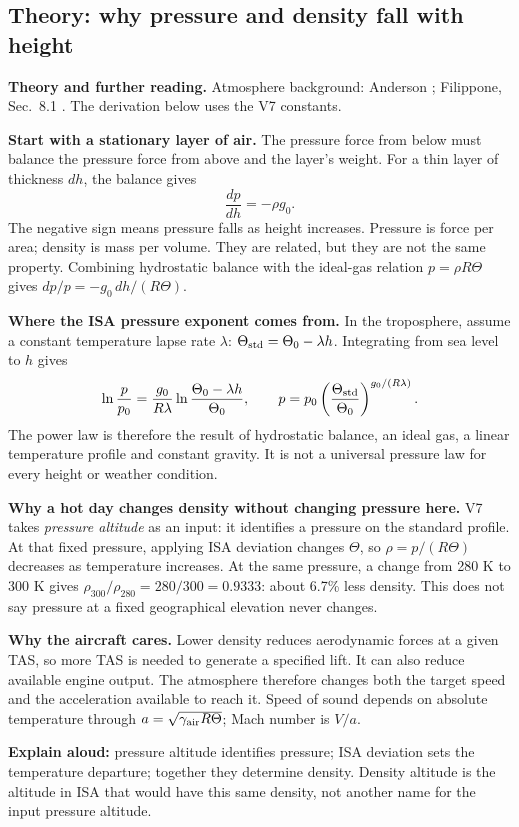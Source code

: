 \documentclass[11pt,letterpaper]{article}
\newcommand{\theorypage}[1]{\clearpage\subsection*{\color{navy}\thesection\enspace Theory: #1}}
\newcommand{\reading}[1]{{\small\color{navy}\textbf{Theory and further reading.} #1\par}\vspace{3pt}}
\begin{document}
\theorypage{why pressure and density fall with height}
\reading{Atmosphere background: Anderson \cite{anderson-flight}; Filippone, Sec.~8.1 \cite{filippone}. The derivation below uses the V7 constants.}
\textbf{Start with a stationary layer of air.}
The pressure force from below must balance the pressure force from above and
the layer's weight. For a thin layer of thickness $dh$, the balance gives
\[
\frac{dp}{dh}=-\rho g_0.
\]
The negative sign means pressure falls as height increases. Pressure is force
per area; density is mass per volume. They are related, but they are not the
same property. Combining hydrostatic balance with the ideal-gas relation
$p=\rho R\Theta$ gives $dp/p=-g_0\,dh/(R\Theta)$.

\textbf{Where the ISA pressure exponent comes from.}
In the troposphere, assume a constant temperature lapse rate $\lambda$:
$\Theta_{\rm std}=\Theta_0-\lambda h$. Integrating from sea level to $h$ gives
\[
\ln\frac{p}{p_0}=\frac{g_0}{R\lambda}
\ln\frac{\Theta_0-\lambda h}{\Theta_0},
\qquad
p=p_0\left(\frac{\Theta_{\rm std}}{\Theta_0}\right)^{g_0/(R\lambda)}.
\]
The power law is therefore the result of hydrostatic balance, an ideal gas,
a linear temperature profile and constant gravity. It is not a universal
pressure law for every height or weather condition.

\textbf{Why a hot day changes density without changing pressure here.}
V7 takes \emph{pressure altitude} as an input: it identifies a pressure on the
standard profile. At that fixed pressure, applying ISA deviation changes
$\Theta$, so $\rho=p/(R\Theta)$ decreases as temperature increases. At the same
pressure, a change from 280 K to 300 K gives
$\rho_{300}/\rho_{280}=280/300=0.9333$: about 6.7\% less density.
This does not say pressure at a fixed geographical elevation never changes.

\textbf{Why the aircraft cares.}
Lower density reduces aerodynamic forces at a given TAS, so more TAS is needed
to generate a specified lift. It can also reduce available engine output.
The atmosphere therefore changes both the target speed and the acceleration
available to reach it. Speed of sound depends on absolute temperature through
$a=\sqrt{\gamma_{\rm air}R\Theta}$; Mach number is $V/a$.

\begin{keyidea}
\textbf{Explain aloud:} pressure altitude identifies pressure; ISA deviation
sets the temperature departure; together they determine density. Density altitude
is the altitude in ISA that would have this same density, not another name for
the input pressure altitude.
\end{keyidea}
\end{document}
